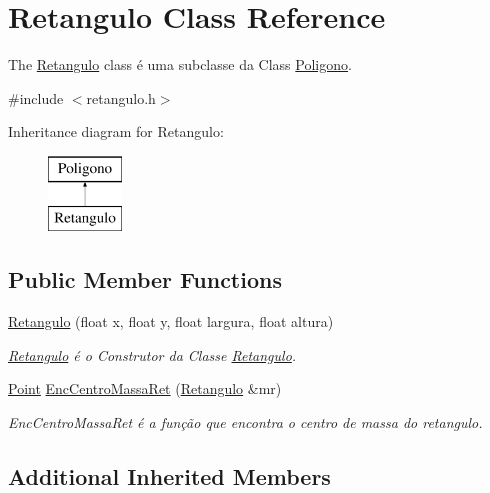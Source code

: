 \hypertarget{class_retangulo}{}\section{Retangulo Class Reference}
\label{class_retangulo}


The \mbox{\hyperlink{class_retangulo}{Retangulo}} class é uma subclasse da Class \mbox{\hyperlink{class_poligono}{Poligono}}.  




{\ttfamily \#include $<$retangulo.\+h$>$}

Inheritance diagram for Retangulo\+:\begin{figure}[H]
\begin{center}
\leavevmode
\includegraphics[height=2.000000cm]{class_retangulo}
\end{center}
\end{figure}
\subsection*{Public Member Functions}
\begin{DoxyCompactItemize}
\item 
\mbox{\hyperlink{class_retangulo_acca1dd211eefc8dc04658c943c0d1122}{Retangulo}} (float x, float y, float largura, float altura)
\begin{DoxyCompactList}\small\item\em \mbox{\hyperlink{class_retangulo}{Retangulo}} é o Construtor da Classe \mbox{\hyperlink{class_retangulo}{Retangulo}}. \end{DoxyCompactList}\item 
\mbox{\hyperlink{class_point}{Point}} \mbox{\hyperlink{class_retangulo_a0f6df53839be4fab7ffef3172481dcb6}{Enc\+Centro\+Massa\+Ret}} (\mbox{\hyperlink{class_retangulo}{Retangulo}} \&mr)
\begin{DoxyCompactList}\small\item\em Enc\+Centro\+Massa\+Ret é a função que encontra o centro de massa do retangulo. \end{DoxyCompactList}\end{DoxyCompactItemize}
\subsection*{Additional Inherited Members}


